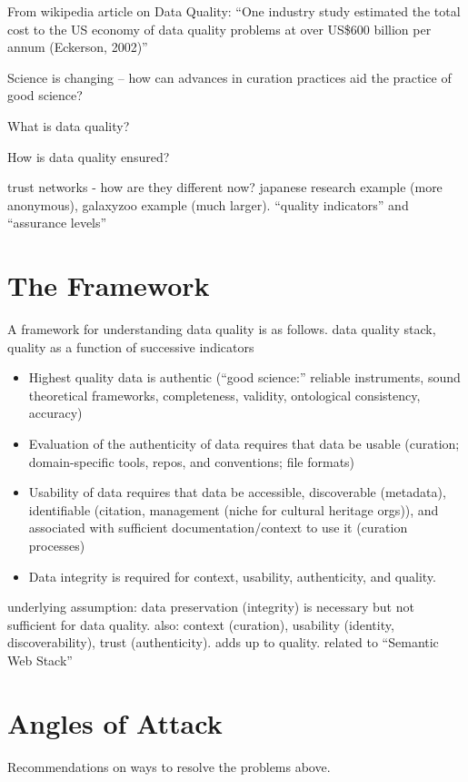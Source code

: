 \documentclass{acm_proc_article-sp}
\begin{document}
From wikipedia article on Data Quality: ``One industry study estimated the total cost to the US economy of data quality problems at over US\$600 billion per annum (Eckerson, 2002)''

Science is changing -- how can advances in curation practices aid the
practice of good science?

What is data quality?

How is data quality ensured?

trust networks - how are they different now? japanese research example (more
anonymous), galaxyzoo example (much larger). ``quality indicators'' and
``assurance levels''



\section{The Framework}
A framework for understanding data quality is as follows.  data quality stack,
quality as a function of successive indicators

\begin{itemize}
\item Highest quality data is authentic (``good science:'' reliable
  instruments, sound theoretical frameworks, completeness, validity,
  ontological consistency, accuracy)
\item Evaluation of the authenticity of data requires that data be usable
  (curation; domain-specific tools, repos, and conventions; file formats)
\item Usability of data requires that data be accessible, discoverable
  (metadata), identifiable (citation, management (niche for cultural
  heritage orgs)), and associated with sufficient
  documentation/context to use it (curation processes)
\item Data integrity is required for context, usability, authenticity, and
  quality.
\end{itemize}

underlying assumption: data preservation (integrity) is necessary but not
sufficient for data quality. also: context (curation), usability (identity,
discoverability), trust (authenticity). adds up to quality. related to
``Semantic Web Stack''

\section{Angles of Attack}
Recommendations on ways to resolve the problems above.
\end{document}
